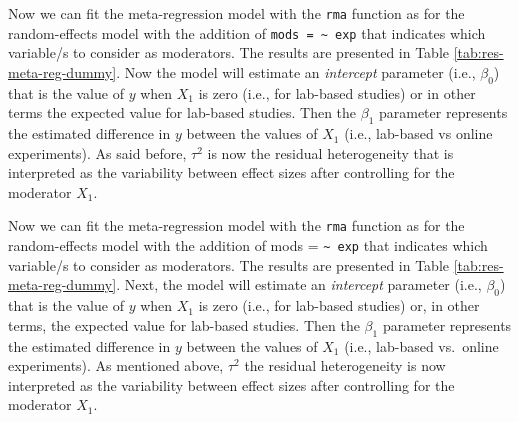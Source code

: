 \documentclass[
  man,floatsintext]{apa6}
\begin{document}
\normalsize

Now we can fit the meta-regression model with the \texttt{rma} function as for the random-effects model with the addition of \texttt{mods\ =\ \textasciitilde{}\ exp} that indicates which variable/s to consider as moderators. The results are presented in Table \ref{tab:res-meta-reg-dummy}. Now the model will estimate an \emph{intercept} parameter (i.e., \(\beta_0\)) that is the value of \(y\) when \(X_1\) is zero (i.e., for lab-based studies) or in other terms the expected value for lab-based studies. Then the \(\beta_1\) parameter represents the estimated difference in \(y\) between the values of \(X_1\) (i.e., lab-based vs online experiments). As said before, \(\tau^2\) is now the residual heterogeneity that is interpreted as the variability between effect sizes after controlling for the moderator \(X_1\).

Now we can fit the meta-regression model with the \texttt{rma} function as for the random-effects model with the addition of mods = \texttt{\textasciitilde{}\ exp} that indicates which variable/s to consider as moderators. The results are presented in Table \ref{tab:res-meta-reg-dummy}. Next, the model will estimate an \emph{intercept} parameter (i.e., \(\beta_{0}\)) that is the value of \(y\) when \(X_{1}\) is zero (i.e., for lab-based studies) or, in other terms, the expected value for lab-based studies. Then the \(\beta_{1}\) parameter represents the estimated difference in \(y\) between the values of \(X_{1}\) (i.e., lab-based vs.~online experiments). As mentioned above, \(\tau^{2}\) the residual heterogeneity is now interpreted as the variability between effect sizes after controlling for the moderator \(X_{1}\).

\scriptsize
\end{document}
